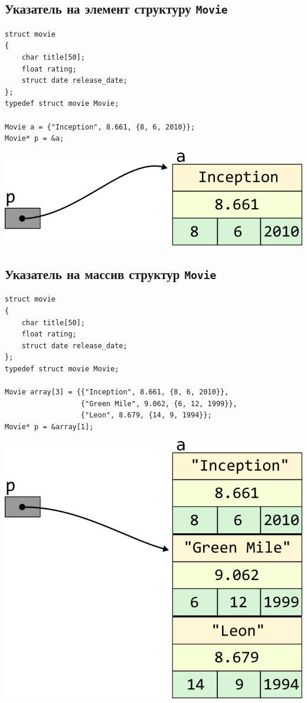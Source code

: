 \documentclass{article}
\begin{document}
\subsection*{Указатель на элемент структуру \texttt{Movie}}
\begin{lstlisting}
struct movie
{
	char title[50];
	float rating;
	struct date release_date;
};
typedef struct movie Movie;

Movie a = {"Inception", 8.661, {8, 6, 2010}};
Movie* p = &a;
\end{lstlisting}
\begin{center}
\includegraphics[scale=1]{../../images/pointer_schemes/pointer_to_struct_movie.png}
\end{center}

\subsection*{Указатель на массив структур \texttt{Movie}}
\begin{lstlisting}
struct movie
{
	char title[50];
	float rating;
	struct date release_date;
};
typedef struct movie Movie;

Movie array[3] = {{"Inception", 8.661, {8, 6, 2010}}, 
                  {"Green Mile", 9.062, {6, 12, 1999}}, 
                  {"Leon", 8.679, {14, 9, 1994}};
Movie* p = &array[1];
\end{lstlisting}
\begin{center}
\includegraphics[scale=1]{../../images/pointer_schemes/pointer_to_array_of_struct_movie.png}
\end{center}
\end{document}
